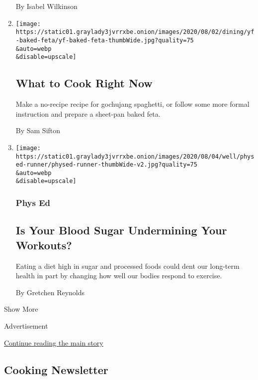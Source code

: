 \begin{enumerate}
  By Isabel Wilkinson
\item
  \href{/2020/07/29/dining/what-to-cook-right-now.html}{}

  \texttt{[image: https://static01.graylady3jvrrxbe.onion/images/2020/08/02/dining/yf-baked-feta/yf-baked-feta-thumbWide.jpg?quality=75\\\&auto=webp\\\&disable=upscale]}

  \hypertarget{what-to-cook-right-now}{%
  \subsection{What to Cook Right Now}\label{what-to-cook-right-now}}

  Make a no-recipe recipe for gochujang spaghetti, or follow some more
  formal instruction and prepare a sheet-pan baked feta.

  By Sam Sifton
\item
  \href{/2020/07/29/well/move/blood-sugar-diet-foods-workouts-exercise-muscles.html}{}

  \texttt{[image: https://static01.graylady3jvrrxbe.onion/images/2020/08/04/well/physed-runner/physed-runner-thumbWide-v2.jpg?quality=75\\\&auto=webp\\\&disable=upscale]}

  \hypertarget{phys-ed}{%
  \subsubsection{Phys Ed}\label{phys-ed}}

  \hypertarget{is-your-blood-sugar-undermining-your-workouts}{%
  \subsection{Is Your Blood Sugar Undermining Your
  Workouts?}\label{is-your-blood-sugar-undermining-your-workouts}}

  Eating a diet high in sugar and processed foods could dent our
  long-term health in part by changing how well our bodies respond to
  exercise.

  By Gretchen Reynolds
\end{enumerate}

Show More

Advertisement

\protect\hyperlink{after-mid2}{Continue reading the main story}

\hypertarget{cooking-newsletter}{%
\subsection{Cooking Newsletter}\label{cooking-newsletter}}

